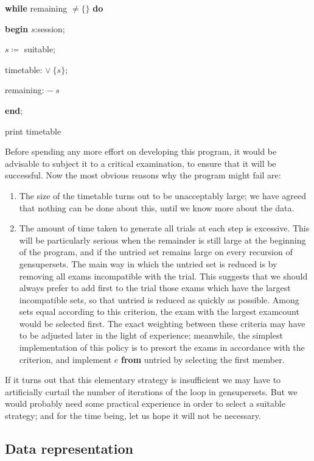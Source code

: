 \documentclass[twoside,11pt]{book}
\begin{document}
\quad \textbf{while} remaining $\neq \{\}$ \textbf{do}

\quad \quad \quad \textbf{begin} $s$:session;

\quad \quad \quad \quad $s\coloneq$ suitable;

\quad \quad \quad \quad timetable: $\vee\ \{s\}$;

\quad \quad \quad \quad remaining: $-\ s$

\quad \quad \quad \textbf{end};

\quad print timetable

Before spending any more effort on developing this program, it would be advisable to subject it to a critical examination, to ensure that it will be successful. Now the most obvious reasons why the program might fail are:

\begin{enumerate}[wide, nosep, label=(\arabic*)]
	\item The size of the timetable turns out to be unacceptably large; we have agreed that nothing can be done about this, until we know more about the data.

	\item The amount of time taken to generate all trials at each step is excessive. This will be particularly serious when the remainder is still large at the beginning of the program, and if the untried set remains large on every recursion of gensupersets. The main way in which the untried set is reduced is by removing all exams incompatible with the trial. This suggests that we should always prefer to add first to the trial those exams which have the largest incompatible sets, so that untried is reduced as quickly as possible. Among sets equal according to this criterion, the exam with the largest examcount would be selected first. The exact weighting between these criteria may have to be adjusted later in the light of experience; meanwhile, the simplest implementation of this policy is to presort the exams in accordance with the criterion, and implement $e$ \textbf{from} untried by selecting the first member.
\end{enumerate}

If it turns out that this elementary strategy is insufficient we may have to artificially curtail the number of iterations of the loop in gensupersets. But we would probably need some practical experience in order to select a suitable strategy; and for the time being, let us hope it will not be necessary.

\subsection{Data representation}
\end{document}
